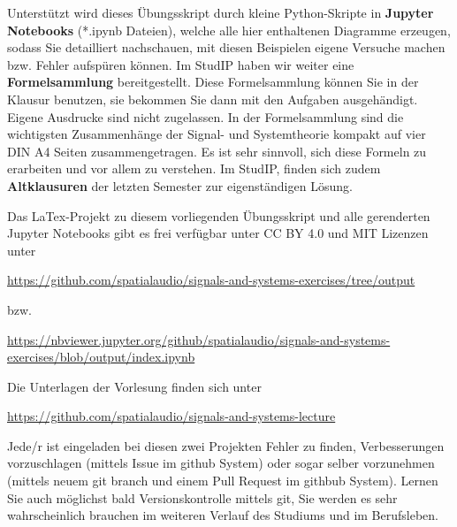 %
Unterstützt wird dieses Übungsskript durch kleine Python-Skripte in
\textbf{Jupyter Notebooks} (*.ipynb Dateien),
welche alle hier enthaltenen Diagramme erzeugen, sodass Sie
detailliert nachschauen, mit diesen Beispielen eigene Versuche machen
bzw. Fehler aufspüren können.
%
Im StudIP haben wir weiter eine \textbf{Formelsammlung} bereitgestellt.
%
Diese Formelsammlung können Sie in der Klausur benutzen, sie bekommen Sie
dann mit den Aufgaben ausgehändigt.
%
Eigene Ausdrucke sind nicht zugelassen.
%
In der Formelsammlung sind die wichtigsten Zusammenhänge der Signal- und
Systemtheorie kompakt auf vier DIN A4 Seiten zusammengetragen.
%
Es ist sehr sinnvoll, sich diese Formeln zu erarbeiten und vor allem zu verstehen.
%
Im StudIP, finden sich zudem \textbf{Altklausuren} der letzten Semester zur eigenständigen Lösung.

\newpage
Das LaTex-Projekt zu diesem vorliegenden Übungsskript und alle gerenderten Jupyter
Notebooks gibt es frei verfügbar unter CC BY 4.0 und MIT Lizenzen unter
\begin{mdframed}[backgroundcolor=C2!10]
\url{https://github.com/spatialaudio/signals-and-systems-exercises/tree/output}
\end{mdframed}
bzw.
\begin{mdframed}[backgroundcolor=C2!10]
\url{https://nbviewer.jupyter.org/github/spatialaudio/signals-and-systems-exercises/blob/output/index.ipynb}
\end{mdframed}
%

%
Die Unterlagen der Vorlesung finden sich unter
\begin{mdframed}[backgroundcolor=C2!10]
\url{https://github.com/spatialaudio/signals-and-systems-lecture}
\end{mdframed}
%
Jede/r ist eingeladen bei diesen zwei Projekten Fehler zu finden, Verbesserungen
vorzuschlagen (mittels Issue im github System) oder sogar selber vorzunehmen
(mittels neuem git branch und einem Pull Request im githbub System).
%
Lernen Sie auch möglichst bald Versionskontrolle mittels git, Sie werden es sehr
wahrscheinlich brauchen im weiteren Verlauf des Studiums und im Berufsleben.

\newpage
